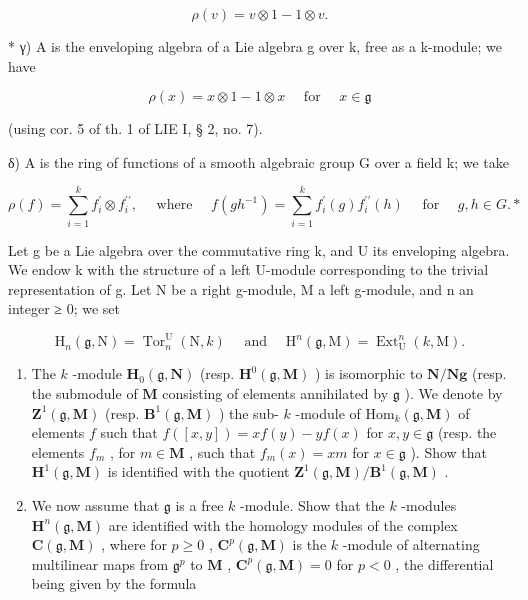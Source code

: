 \[
\rho (v) = v \otimes 1 - 1 \otimes v.
\]

* γ) A is the enveloping algebra of a Lie algebra g over k, free as a k-module; we have

\[
\rho (x) = x \otimes 1 - 1 \otimes x \quad \text { for } \quad x \in \mathfrak {g}
\]

(using cor. 5 of th. 1 of LIE I, § 2, no. 7).

δ) A is the ring of functions of a smooth algebraic group G over a field k; we take

\[
\rho (f) = \sum_ {i = 1} ^ {k} f _ {i} ^ {\prime} \otimes f _ {i} ^ {\prime \prime}, \quad \text { where } \quad f (g h ^ {- 1}) = \sum_ {i = 1} ^ {k} f _ {i} ^ {\prime} (g) f _ {i} ^ {\prime \prime} (h) \quad \text { for } \quad g, h \in G. *
\]

Let g be a Lie algebra over the commutative ring k, and U its enveloping algebra. We endow k with the structure of a left U-module corresponding to the trivial representation of g. Let N be a right g-module, M a left g-module, and n an integer ≥ 0; we set

\[
\mathrm{H} _ {n} (\mathfrak {g}, \mathrm{N}) = \operatorname{Tor} _ {n} ^ {\mathrm{U}} (\mathrm{N}, k) \quad \text { and } \quad \mathrm{H} ^ {n} (\mathfrak {g}, \mathrm{M}) = \operatorname{Ext} _ {\mathrm{U}} ^ {n} (k, \mathrm{M}).
\]

\begin{enumerate}
\def\labelenumi{\alph{enumi})}
\item
  The \(k\) -module \(\mathbf{H}_0(\mathfrak{g}, \mathbf{N})\) (resp. \(\mathbf{H}^0(\mathfrak{g}, \mathbf{M})\) ) is isomorphic to \(\mathbf{N}/\mathbf{Ng}\) (resp. the submodule of \(\mathbf{M}\) consisting of elements annihilated by \(\mathfrak{g}\) ). We denote by \(\mathbf{Z}^1(\mathfrak{g}, \mathbf{M})\) (resp. \(\mathbf{B}^1(\mathfrak{g}, \mathbf{M})\) ) the sub- \(k\) -module of \(\mathrm{Hom}_k(\mathfrak{g}, \mathbf{M})\) of elements \(f\) such that \(f([x, y]) = xf(y) - yf(x)\) for \(x, y \in \mathfrak{g}\) (resp. the elements \(f_m\) , for \(m \in \mathbf{M}\) , such that \(f_m(x) = xm\) for \(x \in \mathfrak{g}\) ). Show that \(\mathbf{H}^1(\mathfrak{g}, \mathbf{M})\) is identified with the quotient \(\mathbf{Z}^1(\mathfrak{g}, \mathbf{M})/\mathbf{B}^1(\mathfrak{g}, \mathbf{M})\) .
\item
  We now assume that \(\mathfrak{g}\) is a free \(k\) -module. Show that the \(k\) -modules \(\mathbf{H}^n(\mathfrak{g}, \mathbf{M})\) are identified with the homology modules of the complex \(\mathbf{C}(\mathfrak{g}, \mathbf{M})\) , where for \(p \geqslant 0\) , \(\mathbf{C}^p(\mathfrak{g}, \mathbf{M})\) is the \(k\) -module of alternating multilinear maps from \(\mathfrak{g}^p\) to \(\mathbf{M}\) , \(\mathbf{C}^p(\mathfrak{g}, \mathbf{M}) = 0\) for \(p < 0\) , the differential being given by the formula
\end{enumerate}

